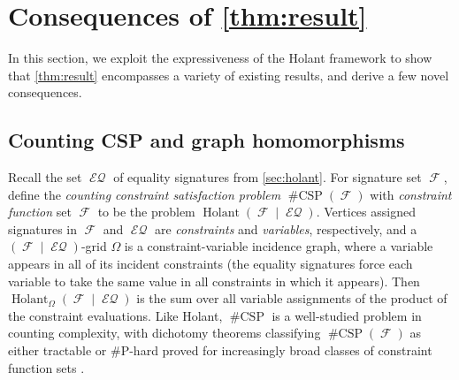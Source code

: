 \documentclass{article}
\DeclareMathOperator{\fc}{\mathcal{F}}
\DeclareMathOperator{\holant}{Holant}
\DeclareMathOperator{\csp}{\#CSP}
\DeclareMathOperator{\eq}{\mathcal{EQ}}
\begin{document}
\section{Consequences of \autoref{thm:result}}
\label{sec:corollaries}
In this section, we exploit the expressiveness of the Holant framework to show that \autoref{thm:result}
encompasses a variety of existing results, and derive a few novel consequences.
\subsection{Counting CSP and graph homomorphisms}
Recall the set $\eq$ of equality signatures from \autoref{sec:holant}.
For signature set $\fc$, define the \emph{counting constraint satisfaction problem} $\csp(\fc)$
with \emph{constraint function} set $\fc$
to be the problem $\holant(\fc \mid \eq)$. Vertices assigned signatures in $\fc$ and $\eq$ are
\emph{constraints} and \emph{variables}, respectively, and a $(\fc\mid\eq)$-grid $\Omega$ is a 
constraint-variable incidence graph, where a variable appears in all of its incident constraints (the equality signatures force each variable to take the same value in all constraints in
which it appears). Then
$\holant_\Omega(\fc\mid\eq)$ is the sum over all variable assignments of the product of the constraint
evaluations.
Like Holant, $\csp$ is a well-studied
problem in counting complexity, with dichotomy theorems classifying $\csp(\fc)$ as either tractable
or \#P-hard proved for increasingly broad classes of constraint function sets 
\cite{bulatov_2013, dyer_richerby, cai-chen-lu, cai-chen-complexity}. 
\end{document}
